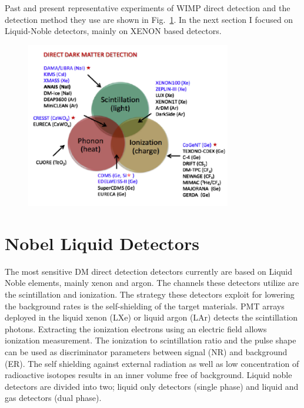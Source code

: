Past and present representative experiments of WIMP direct detection and the detection method they use are shown in Fig.~\ref{fig:det_strategy}. In the next section I focused on Liquid-Noble detectors, mainly on XENON based detectors.  

\begin{figure}[]
	\centering
	\includegraphics[width=0.8\textwidth]{figs/DetChannels.png}
	\label{fig:det_strategy}
\end{figure}

\section{Nobel Liquid Detectors}
\label{sec:liquidDet}

The most sensitive DM direct detection detectors currently are based on Liquid Noble elements, mainly xenon and argon. The channels these detectors utilize are the scintillation and ionization. The strategy these detectors exploit for lowering the background rates is the self-shielding of the target materials. PMT arrays deployed in the liquid xenon (LXe) or liquid argon (LAr) detects the scintillation photons. Extracting the ionization electrons using an electric field allows ionization measurement. The ionization to scintillation ratio and the pulse shape can be used as discriminator parameters between signal (NR) and background (ER). The self shielding against external radiation as well as low concentration of radioactive isotopes results in an inner volume free of background. Liquid noble detectors are divided into two; liquid only detectors (single phase) and liquid and gas detectors (dual phase).

